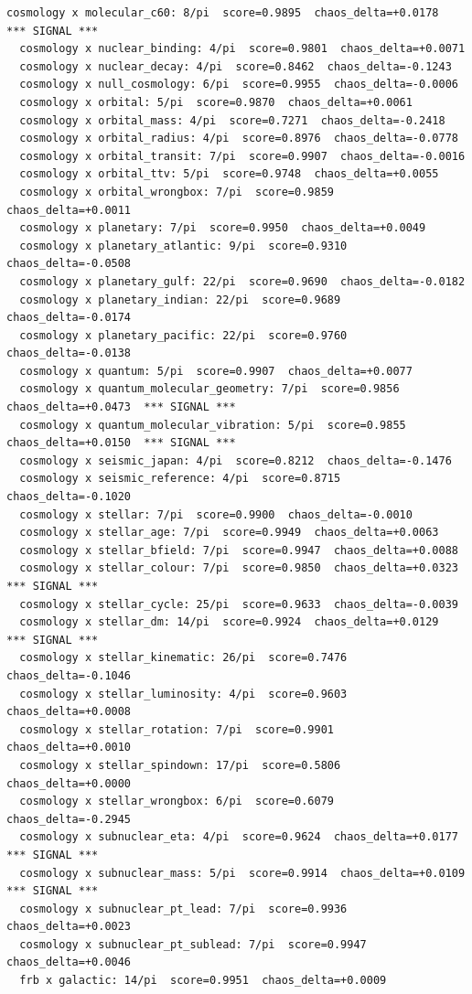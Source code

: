 \documentclass[11pt, letterpaper, openany]{book}
\begin{document}
\begin{empiricalbox}
\begin{lstlisting}[style=terminal]
  cosmology x molecular_c60: 8/pi  score=0.9895  chaos_delta=+0.0178  *** SIGNAL ***
  cosmology x nuclear_binding: 4/pi  score=0.9801  chaos_delta=+0.0071
  cosmology x nuclear_decay: 4/pi  score=0.8462  chaos_delta=-0.1243
  cosmology x null_cosmology: 6/pi  score=0.9955  chaos_delta=-0.0006
  cosmology x orbital: 5/pi  score=0.9870  chaos_delta=+0.0061
  cosmology x orbital_mass: 4/pi  score=0.7271  chaos_delta=-0.2418
  cosmology x orbital_radius: 4/pi  score=0.8976  chaos_delta=-0.0778
  cosmology x orbital_transit: 7/pi  score=0.9907  chaos_delta=-0.0016
  cosmology x orbital_ttv: 5/pi  score=0.9748  chaos_delta=+0.0055
  cosmology x orbital_wrongbox: 7/pi  score=0.9859  chaos_delta=+0.0011
  cosmology x planetary: 7/pi  score=0.9950  chaos_delta=+0.0049
  cosmology x planetary_atlantic: 9/pi  score=0.9310  chaos_delta=-0.0508
  cosmology x planetary_gulf: 22/pi  score=0.9690  chaos_delta=-0.0182
  cosmology x planetary_indian: 22/pi  score=0.9689  chaos_delta=-0.0174
  cosmology x planetary_pacific: 22/pi  score=0.9760  chaos_delta=-0.0138
  cosmology x quantum: 5/pi  score=0.9907  chaos_delta=+0.0077
  cosmology x quantum_molecular_geometry: 7/pi  score=0.9856  chaos_delta=+0.0473  *** SIGNAL ***
  cosmology x quantum_molecular_vibration: 5/pi  score=0.9855  chaos_delta=+0.0150  *** SIGNAL ***
  cosmology x seismic_japan: 4/pi  score=0.8212  chaos_delta=-0.1476
  cosmology x seismic_reference: 4/pi  score=0.8715  chaos_delta=-0.1020
  cosmology x stellar: 7/pi  score=0.9900  chaos_delta=-0.0010
  cosmology x stellar_age: 7/pi  score=0.9949  chaos_delta=+0.0063
  cosmology x stellar_bfield: 7/pi  score=0.9947  chaos_delta=+0.0088
  cosmology x stellar_colour: 7/pi  score=0.9850  chaos_delta=+0.0323  *** SIGNAL ***
  cosmology x stellar_cycle: 25/pi  score=0.9633  chaos_delta=-0.0039
  cosmology x stellar_dm: 14/pi  score=0.9924  chaos_delta=+0.0129  *** SIGNAL ***
  cosmology x stellar_kinematic: 26/pi  score=0.7476  chaos_delta=-0.1046
  cosmology x stellar_luminosity: 4/pi  score=0.9603  chaos_delta=+0.0008
  cosmology x stellar_rotation: 7/pi  score=0.9901  chaos_delta=+0.0010
  cosmology x stellar_spindown: 17/pi  score=0.5806  chaos_delta=+0.0000
  cosmology x stellar_wrongbox: 6/pi  score=0.6079  chaos_delta=-0.2945
  cosmology x subnuclear_eta: 4/pi  score=0.9624  chaos_delta=+0.0177  *** SIGNAL ***
  cosmology x subnuclear_mass: 5/pi  score=0.9914  chaos_delta=+0.0109  *** SIGNAL ***
  cosmology x subnuclear_pt_lead: 7/pi  score=0.9936  chaos_delta=+0.0023
  cosmology x subnuclear_pt_sublead: 7/pi  score=0.9947  chaos_delta=+0.0046
  frb x galactic: 14/pi  score=0.9951  chaos_delta=+0.0009

\end{lstlisting}
\end{empiricalbox}
\end{document}
